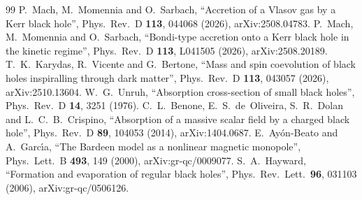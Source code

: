 \documentclass[11pt,a4paper]{article}
\theoremstyle{remark}
\numberwithin{equation}{section}
\begin{document}
\begin{thebibliography}{99}
 P.~Mach, M.~Momennia and O.~Sarbach, ``Accretion of a Vlasov gas by a Kerr black hole'', Phys.\ Rev.\ D \textbf{113}, 044068 (2026), arXiv:2508.04783.
 P.~Mach, M.~Momennia and O.~Sarbach, ``Bondi-type accretion onto a Kerr black hole in the kinetic regime'', Phys.\ Rev.\ D \textbf{113}, L041505 (2026), arXiv:2508.20189.
 T.~K.~Karydas, R.~Vicente and G.~Bertone, ``Mass and spin coevolution of black holes inspiralling through dark matter'', Phys.\ Rev.\ D \textbf{113}, 043057 (2026), arXiv:2510.13604.
 W.~G.~Unruh, ``Absorption cross-section of small black holes'', Phys.\ Rev.\ D \textbf{14}, 3251 (1976).
 C.~L.~Benone, E.~S.~de~Oliveira, S.~R.~Dolan and L.~C.~B.~Crispino, ``Absorption of a massive scalar field by a charged black hole'', Phys.\ Rev.\ D \textbf{89}, 104053 (2014), arXiv:1404.0687.
 E.~Ay\'on-Beato and A.~Garc\'{\i}a, ``The Bardeen model as a nonlinear magnetic monopole'', Phys.\ Lett.\ B \textbf{493}, 149 (2000), arXiv:gr-qc/0009077.
 S.~A.~Hayward, ``Formation and evaporation of regular black holes'', Phys.\ Rev.\ Lett.\ \textbf{96}, 031103 (2006), arXiv:gr-qc/0506126.

\end{thebibliography}
\end{document}

